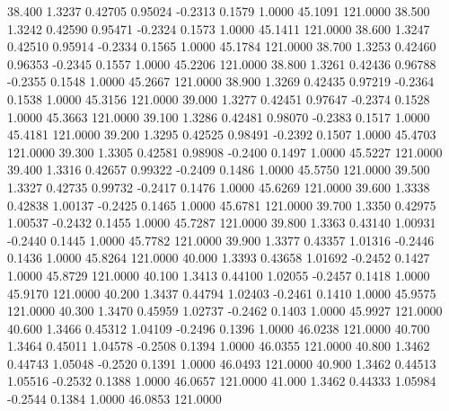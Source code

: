   38.400   1.3237   0.42705   0.95024  -0.2313   0.1579   1.0000  45.1091 121.0000
  38.500   1.3242   0.42590   0.95471  -0.2324   0.1573   1.0000  45.1411 121.0000
  38.600   1.3247   0.42510   0.95914  -0.2334   0.1565   1.0000  45.1784 121.0000
  38.700   1.3253   0.42460   0.96353  -0.2345   0.1557   1.0000  45.2206 121.0000
  38.800   1.3261   0.42436   0.96788  -0.2355   0.1548   1.0000  45.2667 121.0000
  38.900   1.3269   0.42435   0.97219  -0.2364   0.1538   1.0000  45.3156 121.0000
  39.000   1.3277   0.42451   0.97647  -0.2374   0.1528   1.0000  45.3663 121.0000
  39.100   1.3286   0.42481   0.98070  -0.2383   0.1517   1.0000  45.4181 121.0000
  39.200   1.3295   0.42525   0.98491  -0.2392   0.1507   1.0000  45.4703 121.0000
  39.300   1.3305   0.42581   0.98908  -0.2400   0.1497   1.0000  45.5227 121.0000
  39.400   1.3316   0.42657   0.99322  -0.2409   0.1486   1.0000  45.5750 121.0000
  39.500   1.3327   0.42735   0.99732  -0.2417   0.1476   1.0000  45.6269 121.0000
  39.600   1.3338   0.42838   1.00137  -0.2425   0.1465   1.0000  45.6781 121.0000
  39.700   1.3350   0.42975   1.00537  -0.2432   0.1455   1.0000  45.7287 121.0000
  39.800   1.3363   0.43140   1.00931  -0.2440   0.1445   1.0000  45.7782 121.0000
  39.900   1.3377   0.43357   1.01316  -0.2446   0.1436   1.0000  45.8264 121.0000
  40.000   1.3393   0.43658   1.01692  -0.2452   0.1427   1.0000  45.8729 121.0000
  40.100   1.3413   0.44100   1.02055  -0.2457   0.1418   1.0000  45.9170 121.0000
  40.200   1.3437   0.44794   1.02403  -0.2461   0.1410   1.0000  45.9575 121.0000
  40.300   1.3470   0.45959   1.02737  -0.2462   0.1403   1.0000  45.9927 121.0000
  40.600   1.3466   0.45312   1.04109  -0.2496   0.1396   1.0000  46.0238 121.0000
  40.700   1.3464   0.45011   1.04578  -0.2508   0.1394   1.0000  46.0355 121.0000
  40.800   1.3462   0.44743   1.05048  -0.2520   0.1391   1.0000  46.0493 121.0000
  40.900   1.3462   0.44513   1.05516  -0.2532   0.1388   1.0000  46.0657 121.0000
  41.000   1.3462   0.44333   1.05984  -0.2544   0.1384   1.0000  46.0853 121.0000
